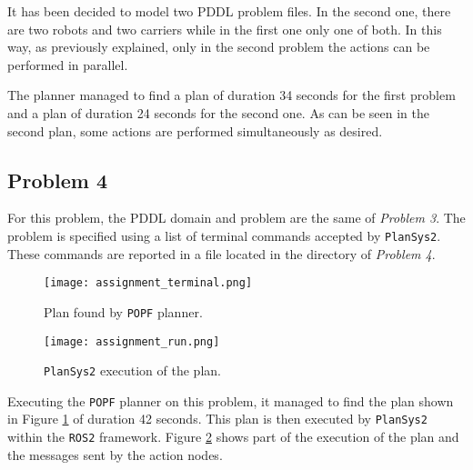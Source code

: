 It has been decided to model two PDDL problem files.
In the second one, there are two robots and two carriers while in the first one only one of both.
In this way, as previously explained, only in the second problem the actions can be performed in parallel.

The planner managed to find a plan of duration 34 seconds for the first problem and a plan of
duration 24 seconds for the second one.
As can be seen in the second plan, some actions are performed simultaneously as desired.

\subsection{Problem 4}
For this problem, the PDDL domain and problem are the same of \textit{Problem 3}.
The problem is specified using a list of terminal commands accepted by \texttt{PlanSys2}.
These commands are reported in a file located in the directory of \textit{Problem 4}.


\begin{figure}[t]
\centerline{\texttt{[image: assignment\_terminal.png]}}
\caption{Plan found by \texttt{POPF} planner.}
\label{fig:plan}
\end{figure}
    
\begin{figure}[t]
\centerline{\texttt{[image: assignment\_run.png]}}
\caption{\texttt{PlanSys2} execution of the plan.}
\label{fig:execution}
\end{figure}

Executing the \texttt{POPF} planner on this problem, it managed to find the plan shown in Figure 
\ref{fig:plan} of duration 42 seconds.
This plan is then executed by \texttt{PlanSys2} within the \texttt{ROS2} framework. 
Figure \ref{fig:execution} shows part of the execution of the plan and the messages sent by the action nodes.

